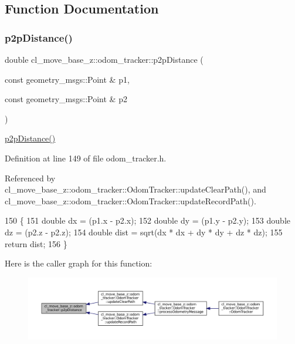 \subsection{Function Documentation}
\mbox{\label{namespacecl__move__base__z_1_1odom__tracker_a501582a760a02ce0069d95bfc67ca973}} 
\subsubsection{\texorpdfstring{p2p\+Distance()}{p2pDistance()}}
{\footnotesize\ttfamily double cl\+\_\+move\+\_\+base\+\_\+z\+::odom\+\_\+tracker\+::p2p\+Distance (\begin{DoxyParamCaption}\item[{const geometry\+\_\+msgs\+::\+Point \&}]{p1,  }\item[{const geometry\+\_\+msgs\+::\+Point \&}]{p2 }\end{DoxyParamCaption})\hspace{0.3cm}{\ttfamily [inline]}}

\hyperlink{namespacecl__move__base__z_1_1odom__tracker_a501582a760a02ce0069d95bfc67ca973}{p2p\+Distance()} 

Definition at line 149 of file odom\+\_\+tracker.\+h.



Referenced by cl\+\_\+move\+\_\+base\+\_\+z\+::odom\+\_\+tracker\+::\+Odom\+Tracker\+::update\+Clear\+Path(), and cl\+\_\+move\+\_\+base\+\_\+z\+::odom\+\_\+tracker\+::\+Odom\+Tracker\+::update\+Record\+Path().


\begin{DoxyCode}
150 \{
151     \textcolor{keywordtype}{double} dx = (p1.x - p2.x);
152     \textcolor{keywordtype}{double} dy = (p1.y - p2.y);
153     \textcolor{keywordtype}{double} dz = (p2.z - p2.z);
154     \textcolor{keywordtype}{double} dist = sqrt(dx * dx + dy * dy + dz * dz);
155     \textcolor{keywordflow}{return} dist;
156 \}
\end{DoxyCode}
Here is the caller graph for this function\+:
\nopagebreak
\begin{figure}[H]
\begin{center}
\leavevmode
\includegraphics[width=350pt]{namespacecl__move__base__z_1_1odom__tracker_a501582a760a02ce0069d95bfc67ca973_icgraph}
\end{center}
\end{figure}
